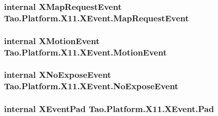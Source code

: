 \hypertarget{struct_tao_1_1_platform_1_1_x11_1_1_x_event_a640df01f825ec17d1b9a8d13ec40447b}{
\subsubsection[{MapRequestEvent}]{\setlength{\rightskip}{0pt plus 5cm}internal {\bf XMapRequestEvent} {\bf Tao.Platform.X11.XEvent.MapRequestEvent}}}
\label{struct_tao_1_1_platform_1_1_x11_1_1_x_event_a640df01f825ec17d1b9a8d13ec40447b}
\hypertarget{struct_tao_1_1_platform_1_1_x11_1_1_x_event_a199f966c56a47165d4b6e93d5b12a3ea}{
\subsubsection[{MotionEvent}]{\setlength{\rightskip}{0pt plus 5cm}internal {\bf XMotionEvent} {\bf Tao.Platform.X11.XEvent.MotionEvent}}}
\label{struct_tao_1_1_platform_1_1_x11_1_1_x_event_a199f966c56a47165d4b6e93d5b12a3ea}
\hypertarget{struct_tao_1_1_platform_1_1_x11_1_1_x_event_a4f164739054a04d890682f8895d334c7}{
\subsubsection[{NoExposeEvent}]{\setlength{\rightskip}{0pt plus 5cm}internal {\bf XNoExposeEvent} {\bf Tao.Platform.X11.XEvent.NoExposeEvent}}}
\label{struct_tao_1_1_platform_1_1_x11_1_1_x_event_a4f164739054a04d890682f8895d334c7}
\hypertarget{struct_tao_1_1_platform_1_1_x11_1_1_x_event_a436feb972007223cee91783bf2021907}{
\subsubsection[{Pad}]{\setlength{\rightskip}{0pt plus 5cm}internal {\bf XEventPad} {\bf Tao.Platform.X11.XEvent.Pad}}}
\label{struct_tao_1_1_platform_1_1_x11_1_1_x_event_a436feb972007223cee91783bf2021907}

